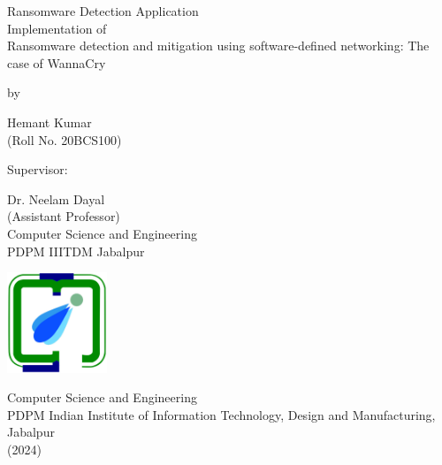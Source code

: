 \documentclass[12pt,twocolumn]{article}
\begin{document}
\begin{titlepage}
    \begin{center}
        \vspace*{1cm}
        
        {\LARGE Ransomware Detection Application} \\
        \Large{Implementation of \\ {Ransomware detection and mitigation using software-defined networking: The case of WannaCry} }
        
        \vspace{0.6cm}
        
        \Large by
        
        {\Large Hemant Kumar} \\
        (Roll No. 20BCS100)
        
        \vspace{1cm}
        
        \Large Supervisor:
        
        {\Large Dr. Neelam Dayal }\\
            (Assistant Professor) \\
        Computer Science and Engineering \\
        PDPM IIITDM Jabalpur
        
        \vspace{1cm}
        
        
        
        \vfill
        
        \includegraphics[width=30mm]{logo_college copy.png}
        
        \vspace{0.5cm}
        
        \Large{Computer Science and Engineering 
        \\ PDPM Indian Institute of Information Technology, Design and Manufacturing, Jabalpur}
        \\ (2024)
        
    \end{center}
\end{titlepage}
\end{document}
